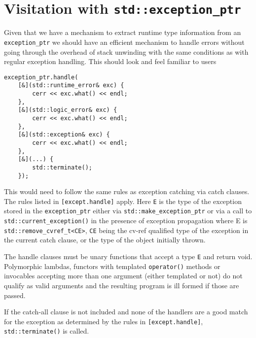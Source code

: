 \documentclass{article}
\begin{document}
\section{Visitation with \texttt{std::exception\_ptr}}
Given that we have a mechanism to extract runtime type information from an
\texttt{exception\_ptr} we should have an efficient mechanism to handle errors
without going through the overhead of stack unwinding with the same conditions
as with regular exception handling.  This should look and feel familiar to
users
\begin{lstlisting}
exception_ptr.handle(
    [&](std::runtime_error& exc) {
        cerr << exc.what() << endl;
    },
    [&](std::logic_error& exc) {
        cerr << exc.what() << endl;
    },
    [&](std::exception& exc) {
        cerr << exc.what() << endl;
    },
    [&](...) {
        std::terminate();
    });
\end{lstlisting}

This would need to follow the same rules as exception catching via catch
clauses.  The rules listed in \texttt{[except.handle]} apply.  Here \texttt{E}
is the type of the exception stored in the \texttt{exception\_ptr} either via
\texttt{std::make\_exception\_ptr} or via a call to
\texttt{std::current\_exception()} in the presence of exception propagation
where E is \texttt{std::remove\_cvref\_t<CE>}, \texttt{CE} being the cv-ref
qualified type of the exception in the current catch clause, or the type of
the object initially thrown.

The handle clauses must be unary functions that accept a type \texttt{E} and
return void.  Polymorphic lambdas, functors with templated \texttt{operator()}
methods or invocables accepting more than one argument (either templated or
not) do not qualify as valid arguments and the resulting program is ill formed
if those are passed.

If the catch-all clause is not included and none of the handlers are a good
match for the exception as determined by the rules in
\texttt{[except.handle]}, \texttt{std::terminate()} is called.
\end{document}
